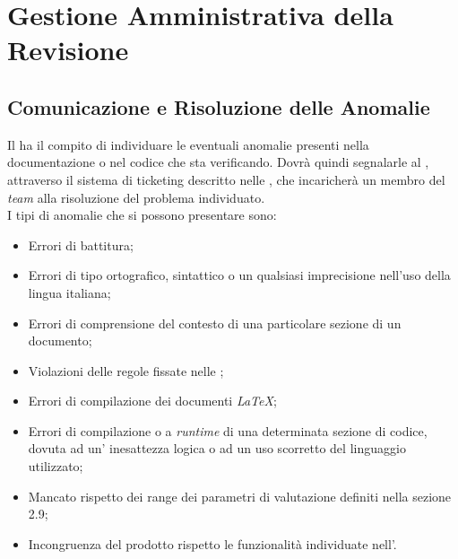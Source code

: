 \newpage
\section{Gestione Amministrativa della Revisione}

\subsection{Comunicazione e Risoluzione delle Anomalie}
Il \textit{\Ver} ha il compito di individuare le eventuali anomalie presenti nella documentazione o nel codice che sta verificando. Dovrà quindi segnalarle al \textit{\RdP}, attraverso il sistema di ticketing descritto nelle \textit{\NdP}, che incaricherà un membro del \textit{team} alla risoluzione del problema individuato.\\ 
I tipi di anomalie che si possono presentare sono:
\begin{itemize} 
\item Errori di battitura;
\item Errori di tipo ortografico, sintattico o un qualsiasi imprecisione nell'uso della lingua italiana; 
\item Errori di comprensione del contesto di una particolare sezione di un documento;
\item Violazioni delle regole fissate nelle \textit{\NdP};
\item Errori di compilazione dei documenti \textit{\LaTeX{}};
\item Errori di compilazione o a \textit{runtime} di una determinata sezione di codice, dovuta ad un' inesattezza logica o ad un uso scorretto del linguaggio utilizzato; 
\item Mancato rispetto dei range dei parametri di valutazione definiti nella sezione 2.9;
\item Incongruenza del prodotto rispetto le funzionalità individuate nell’\textit{\AdR}.
\end{itemize}
